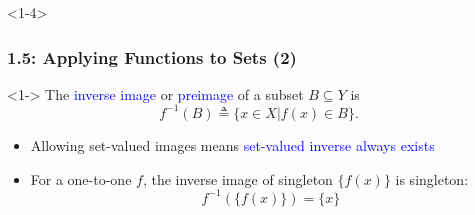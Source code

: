 \documentclass[10pt,english,aspectratio=169]{beamer}
\begin{document}
\begin{frame}<1-4> \frametitle{1.5: Applying Functions to Sets (2)}

\begin{definition}<1->
The \textcolor{blue}{inverse image} or \textcolor{blue}{preimage} of a subset $B\subseteq Y$ is \vspace{-2mm}
\[ f^{-1}(B) \triangleq \{ x\in X | f(x)\in B\}. \]
\end{definition}

\begin{center}
\end{center}
\vspace{-2.5mm}

\begin{itemize}
  \setlength\itemsep{1.25mm}
  \item<3-> Allowing set-valued images means \textcolor{blue}{set-valued inverse always exists}
  \item<4-> For a one-to-one $f$, the inverse image of singleton $\{ f(x) \}$ is singleton: \vspace{-0.5mm}
  \[ f^{-1}( \{f(x) \}) = \{x\} \]
\end{itemize}


\end{frame}  
\end{document}
